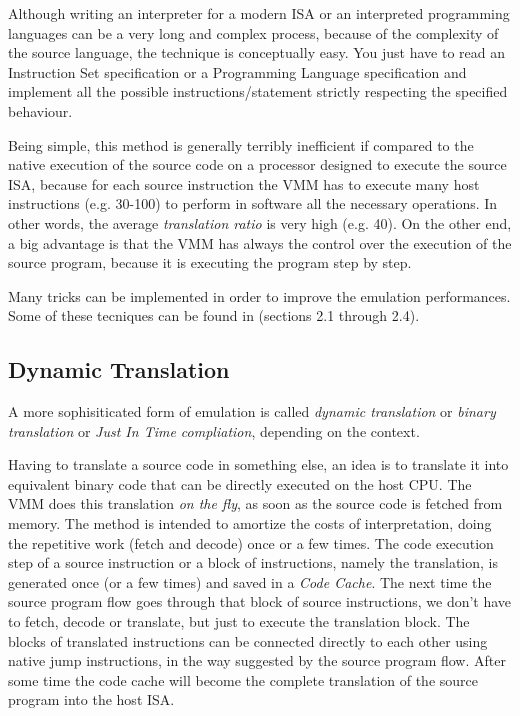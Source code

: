\vspace{0.5cm}

Although writing an interpreter for a modern ISA or an interpreted programming languages can be a very long and complex process,
because of the complexity of the source language, the technique is conceptually easy. You just have to read an Instruction Set 
specification or a Programming Language specification and implement all the possible instructions/statement strictly respecting
the specified behaviour.

Being simple, this method is generally terribly inefficient if compared to the native execution of the source code on a processor
designed to execute the source ISA, because for each source instruction the VMM has to execute many host instructions (e.g. 30-100)
to perform in software all the necessary operations. In other words, the average \emph{translation ratio} is very high (e.g. 40).
On the other end, a big advantage is that the VMM has always the control over the execution of the source program, because it is 
executing the program step by step.

Many tricks can be implemented in order to improve the emulation performances. Some of these tecniques can be found in \cite{ref:vmbook}
(sections 2.1 through 2.4).


\subsection{Dynamic Translation}
A more sophisiticated form of emulation is called \emph{dynamic translation} or \emph{binary translation} or 
\emph{Just In Time compliation}, depending on the context.

Having to translate a source code in something else, an idea is to translate it into equivalent binary code that can be directly
executed on the host CPU. The VMM does this translation \emph{on the fly}, as soon as the source code is fetched from memory.
The method is intended to amortize the costs of interpretation, doing the repetitive work (fetch and decode) once or a few
times. 
The code execution step of a source instruction or a block of instructions, namely the translation, is generated once (or a few times)
and saved in a \emph{Code Cache}. The next time the source program flow goes through that block of source instructions, we don't have
to fetch, decode or translate, but just to execute the translation block.
The blocks of translated instructions can be connected directly to each other using native jump instructions, 
in the way suggested by the source program flow. After some time the code cache will become the complete translation of the source program
into the host ISA.


